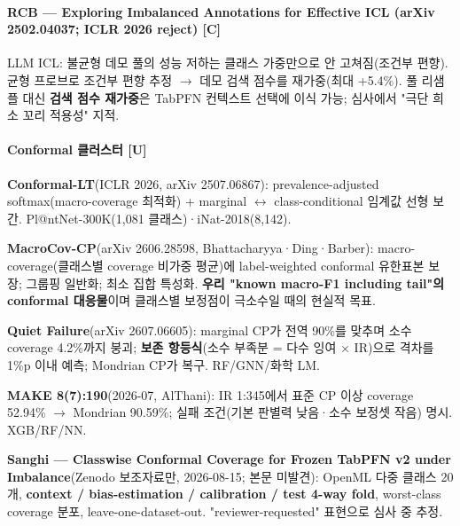 \paragraph{RCB — Exploring Imbalanced Annotations for Effective ICL (arXiv 2502.04037; ICLR 2026 reject) [C]}
\par\noindent \textbullet\enspace LLM ICL: 불균형 데모 풀의 성능 저하는 클래스 가중만으로 안 고쳐짐(조건부 편향). 균형 프로브로 조건부 편향 추정  \ensuremath{\rightarrow}  데모 검색 점수를 재가중(최대 +\allowbreak{}5.4\%). 풀 리샘플 대신 \textbf{검색 점수 재가중}은 TabPFN 컨텍스트 선택에 이식 가능; 심사에서 "극단 희소 꼬리 적용성" 지적.


\paragraph{Conformal 클러스터 [U]}
\par\noindent \textbullet\enspace \textbf{Conformal-LT}(ICLR 2026, arXiv 2507.06867): prevalence-adjusted softmax(macro-coverage 최적화) +\allowbreak{} marginal \ensuremath{\leftrightarrow} class-conditional 임계값 선형 보간. Pl@ntNet-300K(1,081 클래스)·iNat-2018(8,142).


\par\noindent \textbullet\enspace \textbf{MacroCov-CP}(arXiv 2606.28598, Bhattacharyya·Ding·Barber): macro-coverage(클래스별 coverage 비가중 평균)에 label-weighted conformal 유한표본 보장; 그룹핑 일반화; 최소 집합 특성화. \textbf{우리 "known macro-F1 including tail"의 conformal 대응물}이며 클래스별 보정점이 극소수일 때의 현실적 목표.


\par\noindent \textbullet\enspace \textbf{Quiet Failure}(arXiv 2607.06605): marginal CP가 전역 90\%를 맞추며 소수 coverage 4.2\%까지 붕괴; \textbf{보존 항등식}(소수 부족분 =\allowbreak{} 다수 잉여 × IR)으로 격차를 1\%p 이내 예측; Mondrian CP가 복구. RF/\allowbreak{}GNN/\allowbreak{}화학 LM.


\par\noindent \textbullet\enspace \textbf{MAKE 8(7):190}(2026-07, AlThani): IR 1:345에서 표준 CP 이상 coverage 52.94\%  \ensuremath{\rightarrow}  Mondrian 90.59\%; 실패 조건(기본 판별력 낮음·소수 보정셋 작음) 명시. XGB/\allowbreak{}RF/\allowbreak{}NN.


\par\noindent \textbullet\enspace \textbf{Sanghi — Classwise Conformal Coverage for Frozen TabPFN v2 under Imbalance}(Zenodo 보조자료만, 2026-08-15; 본문 미발견): OpenML 다중 클래스 20개, \textbf{context /\allowbreak{} bias-estimation /\allowbreak{} calibration /\allowbreak{} test 4-way fold}, worst-class coverage 분포, leave-one-dataset-out. "reviewer-requested" 표현으로 심사 중 추정.


